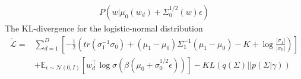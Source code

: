 \begin{align*}
P(w|\mu_0(w_d)+\Sigma_0^{1/2}(w)\epsilon)
\end{align*}
The KL-divergence for the logistic-normal distribution
\begin{align*}
\tilde{\mathcal{L}}=&\sum_{d=1}^{D}\left[-\frac{1}{2}\left(tr(\sigma_1^{-1}\sigma_0)+(\mu_1-\mu_0)\Sigma_1^{-1}(\mu_1-\mu_0)-K+\log\frac{|\sigma_1|}{|\sigma_0|}\right)\right]\\
&+\mathbb{E}_{\epsilon\sim\mathcal{N}(0,I)}\left[w_d^\top\log\sigma(\beta(\mu_0+\sigma_0^{1/2}\epsilon))\right]-KL(q(\Sigma)||p(\Sigma|\gamma))
\end{align*}